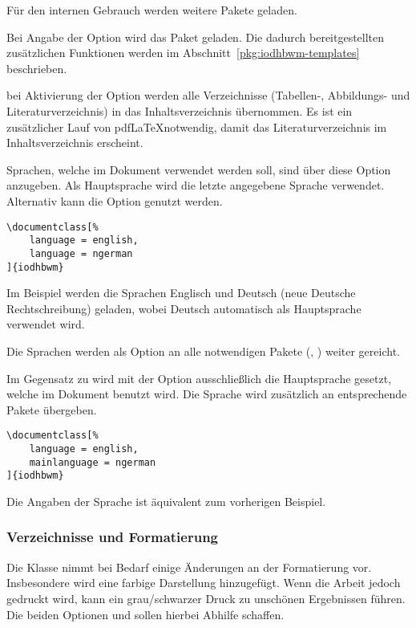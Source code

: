 \documentclass[babel=ngerman,highlight=false]{skdoc}
\begin{document}
                \noindent Für den internen Gebrauch werden weitere Pakete geladen.\medskip

                Bei Angabe der Option wird das Paket  geladen. Die dadurch bereitgestellten zusätzlichen Funktionen werden im Abschnitt~\ref{pkg:iodhbwm-templates} beschrieben.\medskip

                bei Aktivierung der Option werden alle Verzeichnisse (Tabellen-, Abbildungs- und Literaturverzeichnis) in das Inhaltsverzeichnis übernommen. Es ist ein zusätzlicher Lauf von pdf\LaTeX notwendig, damit das Literaturverzeichnis im Inhaltsverzeichnis erscheint.
                \medskip

                Sprachen, welche im Dokument verwendet werden soll, sind über diese Option anzugeben. Als Hauptsprache wird die letzte angegebene Sprache verwendet. Alternativ kann die Option  genutzt werden.

                \begin{verbatim}
\documentclass[%
    language = english,
    language = ngerman
]{iodhbwm}
                \end{verbatim}
                Im Beispiel werden die Sprachen Englisch und Deutsch (neue Deutsche Rechtschreibung) geladen, wobei Deutsch automatisch als Hauptsprache verwendet wird.

                Die Sprachen werden als Option an alle notwendigen Pakete (, ) weiter gereicht.\medskip

                \AndDefault{}\medskip
                Im Gegensatz zu  wird mit der Option ausschließlich die Hauptsprache gesetzt, welche im Dokument benutzt wird. Die Sprache wird zusätzlich an entsprechende Pakete übergeben.

                \begin{verbatim}
\documentclass[%
    language = english,
    mainlanguage = ngerman
]{iodhbwm}
                \end{verbatim}
                Die Angaben der Sprache ist äquivalent zum vorherigen Beispiel.\medskip
                
            \subsubsection{Verzeichnisse und Formatierung}\label{subsub:format}
                Die Klasse nimmt bei Bedarf einige Änderungen an der Formatierung vor. Insbesondere wird eine farbige Darstellung hinzugefügt. Wenn die Arbeit jedoch gedruckt wird, kann ein grau/schwarzer Druck zu unschönen Ergebnissen führen. Die beiden Optionen  und  sollen hierbei Abhilfe schaffen.
            
\end{document}
